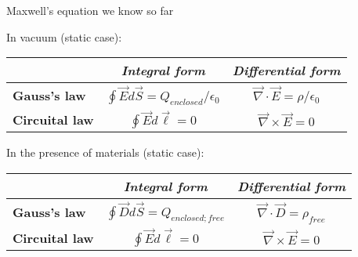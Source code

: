 %
%
%

\begin{frame}{Maxwell's equation we know so far}

In vacuum (static case):

\begin{center}
 {
  \begin{table}[H]
    \begin{tabular}{|l|c|c|}
      \hline
          & {\it Integral form} & {\it Differential form} \\
      \hline
      {\bf Gauss's law} &
        $\oint \vec{E} d\vec{S} = Q_{enclosed} / \epsilon_0$ &
        $\vec{\nabla} \cdot \vec{E} = \rho / \epsilon_0$ \\

      {\bf Circuital law} &
        $\oint \vec{E} d\vec{\ell} = 0$ &
        $\vec{\nabla} \times \vec{E} = 0$ \\
      \hline
    \end{tabular}
  \end{table}
 }
\end{center}

In the presence of materials (static case):

\begin{center}
 {
  \begin{table}[H]
    \begin{tabular}{|l|c|c|}
      \hline
          & {\it Integral form} & {\it Differential form} \\
      \hline
      {\bf Gauss's law} &
        $\oint \vec{D} d\vec{S} = Q_{enclosed; free}$ &
        $\vec{\nabla} \cdot \vec{D} = \rho_{free}$ \\

      {\bf Circuital law} &
        $\oint \vec{E} d\vec{\ell} = 0$ &
        $\vec{\nabla} \times \vec{E} = 0$ \\
      \hline
    \end{tabular}
  \end{table}
 }
\end{center}

\end{frame}
